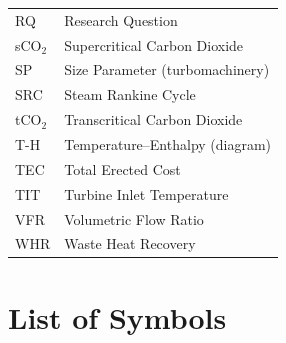 \begin{longtable}{p{3.2cm} p{10.5cm}}
RQ      & Research Question \\
sCO$_2$ & Supercritical Carbon Dioxide \\
SP      & Size Parameter (turbomachinery) \\
SRC     & Steam Rankine Cycle \\
tCO$_2$ & Transcritical Carbon Dioxide \\
T-H     & Temperature--Enthalpy (diagram) \\
TEC     & Total Erected Cost \\
TIT     & Turbine Inlet Temperature \\
VFR     & Volumetric Flow Ratio \\
WHR     & Waste Heat Recovery \\
\end{longtable}

\clearpage

\chapter*{List of Symbols}

